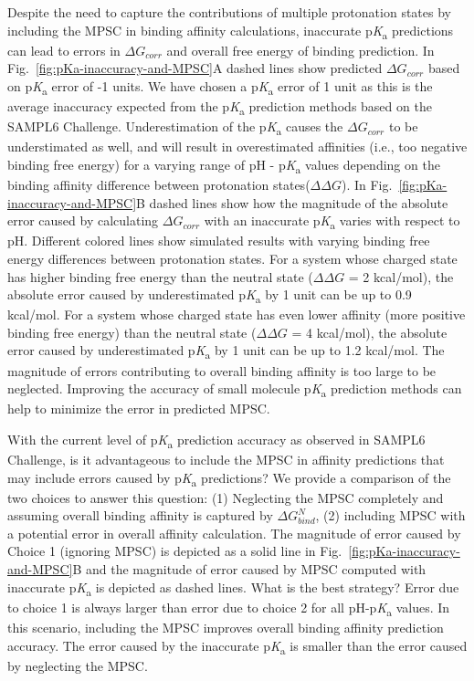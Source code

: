 \documentclass[9pt,lineno,final]{elife}
\newcommand{\pKa}{p\textit{K}\textsubscript{a}}
\begin{document}
Despite the need to capture the contributions of multiple protonation states by including the MPSC in binding affinity calculations, inaccurate \pKa{} predictions can lead to errors in $\Delta G_{corr}$ and overall free energy of binding prediction. 
In Fig.~\ref{fig:pKa-inaccuracy-and-MPSC}A dashed lines show predicted $\Delta G_{corr}$ based on \pKa{} error of -1 units. 
We have chosen a \pKa{} error of 1 unit as this is the average inaccuracy expected from the \pKa{} prediction methods based on the SAMPL6 Challenge.
Underestimation of the \pKa{} causes the $\Delta G_{corr}$ to be understimated as well, and will result in overestimated affinities (i.e., too negative binding free energy) for a varying range of pH - \pKa{} values depending on the binding affinity difference between protonation states($\Delta\Delta G$).
In Fig.~\ref{fig:pKa-inaccuracy-and-MPSC}B dashed lines show how the magnitude of the absolute error caused by calculating $\Delta G_{corr}$ with an inaccurate \pKa{} varies with respect to pH. 
Different colored lines show simulated results with varying binding free energy differences between protonation states. 
For a system whose charged state has higher binding free energy than the neutral state ($\Delta\Delta G$ = 2 kcal/mol), the absolute error caused by underestimated \pKa{} by 1 unit can be up to 0.9 kcal/mol.
For a system whose charged state has even lower affinity (more positive binding free energy) than the neutral state ($\Delta\Delta G$ = 4 kcal/mol), the absolute error caused by underestimated \pKa{} by 1 unit can be up to 1.2 kcal/mol.
The magnitude of errors contributing to overall binding affinity is too large to be neglected. Improving the accuracy of small molecule \pKa{} prediction methods can help to minimize the error in predicted MPSC.

With the current level of \pKa{} prediction accuracy as observed in SAMPL6 Challenge, is it advantageous to include the MPSC in affinity predictions that may include errors caused by \pKa{} predictions? 
We provide a comparison of the two choices to answer this question: (1) Neglecting the MPSC completely and assuming overall binding affinity is captured by $\Delta G_{bind}^{N}$, (2) including MPSC with a potential error in overall affinity calculation. 
The magnitude of error caused by Choice 1 (ignoring MPSC) is depicted as a solid line in Fig.~\ref{fig:pKa-inaccuracy-and-MPSC}B and the magnitude of error caused by MPSC computed with inaccurate \pKa{}  is depicted as dashed lines. 
What is the best strategy? 
Error due to choice 1 is always larger than error due to choice 2 for all pH-\pKa{} values. 
In this scenario, including the MPSC improves overall binding affinity prediction accuracy.
The error caused by the inaccurate \pKa{} is smaller than the error caused by neglecting the MPSC. 
\end{document}
